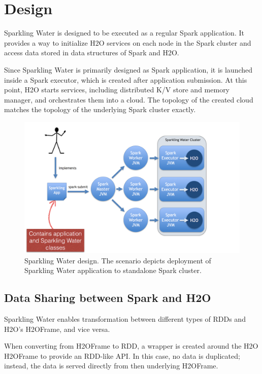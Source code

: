\section{Design}
Sparkling Water is designed to be executed as a regular Spark application. It provides a way to initialize H2O services on each node in the Spark cluster and access data stored in data structures of Spark and H2O.

Since Sparkling Water is primarily designed as Spark application, it is launched
inside a Spark executor, which is created after application submission. At this
point, H2O starts services, including distributed K/V store and memory manager, and orchestrates them into a cloud. The topology of the created cloud matches the topology of the underlying Spark cluster exactly.

\begin{figure}[h]
	\centering
	\includegraphics[width=\textwidth]{sw/images/Topology.png}
	\caption{Sparkling Water design. The scenario depicts deployment of Sparkling Water application to standalone Spark cluster.}
\end{figure}


\subsection{Data Sharing between Spark and H2O}

Sparkling Water enables transformation between different types of RDDs and H2O's H2OFrame, and vice versa.

When converting from H2OFrame to RDD, a wrapper is created around the H2O H2OFrame to provide an RDD-like API. In this case, no data is duplicated; instead, the data is served directly from then underlying H2OFrame.

